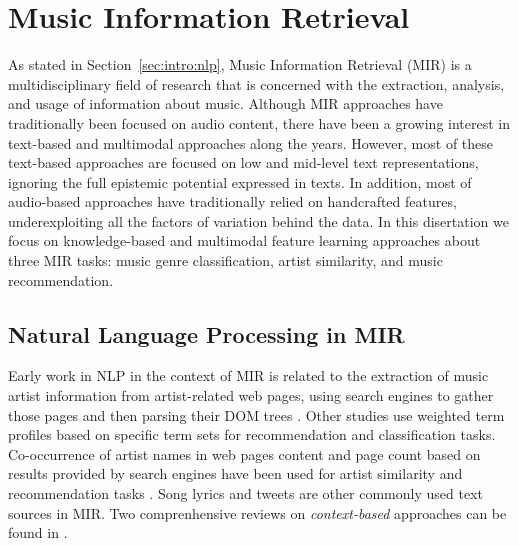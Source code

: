 \section{Music Information Retrieval}
\label{sec:SOA:mir}

As stated in Section~\ref{sec:intro:nlp}, Music Information Retrieval (MIR) is a multidisciplinary field of research that is concerned with the extraction, analysis, and usage of information about music. %
Although MIR approaches have traditionally been focused on audio content, there have been a growing interest in text-based and multimodal approaches along the years. However, most of these text-based approaches are focused on low and mid-level text representations, ignoring the full epistemic potential expressed in texts. In addition, most of audio-based approaches have traditionally relied on handcrafted features, underexploiting all the factors of variation behind the data.
In this disertation we focus on knowledge-based and multimodal feature learning approaches about three MIR tasks: music genre classification, artist similarity, and music recommendation.

\subsection{Natural Language Processing in MIR}

Early work in NLP in the context of MIR is related to the extraction of music artist information from artist-related web pages, using search engines to gather those pages and then parsing their DOM trees \cite{Cohen2000}. Other studies \cite{Ellis2002,Whitman2002} use weighted term profiles based on specific term sets for recommendation and classification tasks. 
Co-occurrence of artist names in web pages content and page count based on results provided by search engines have been used for artist similarity and recommendation tasks \cite{Schedl2005}. Song lyrics \cite{} and tweets \cite{Schedl2013a} are other commonly used text sources in MIR. %
Two comprenhensive reviews on \textit{context-based} approaches can be found in \cite{Knees2013, Schedl2014}.

